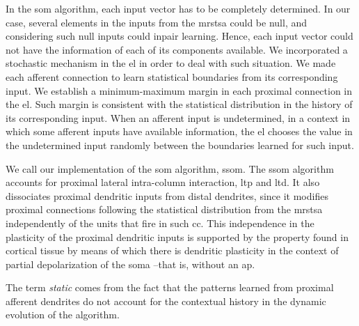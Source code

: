 {In the \gls{som} algorithm, each input vector has to be completely determined.
In our case, several elements in the inputs from the \gls{mrstsa} could be null,
and considering such null inputs could inpair learning. 
Hence, each input vector could not have the information of each of its components available.
We incorporated a stochastic mechanism in the \gls{el} in order to deal with such situation.
We made each afferent connection to learn statistical boundaries from its corresponding input.
We establish a minimum-maximum margin in each proximal connection in the \gls{el}.
Such margin is consistent with the statistical distribution in the history of its corresponding input.
When an afferent input is undetermined, in a context in which some afferent inputs have
available information,
the \gls{el} chooses
the value in the undetermined input
randomly
between the boundaries learned for such input.

We call our implementation of the \gls{som} algorithm, \gls{ssom}.
The \gls{ssom} algorithm accounts for proximal lateral intra-column interaction, \gls{ltp} and
\gls{ltd}.
It also dissociates proximal dendritic inputs from distal dendrites, since
it modifies
proximal connections
following the statistical distribution from the
\gls{mrstsa} independently of the units that fire in such \gls{cc}.
This independence in the plasticity of the proximal dendritic inputs
is supported by
the
property
found in cortical tissue by means of which there is dendritic plasticity
in the context of partial depolarization of the soma \cite{reiter_1998}--that is, without an \gls{ap}. %

The term \textit{static} comes from the fact that the patterns learned from proximal afferent
dendrites do not account for the contextual history in the dynamic evolution
of the algorithm.
}






























